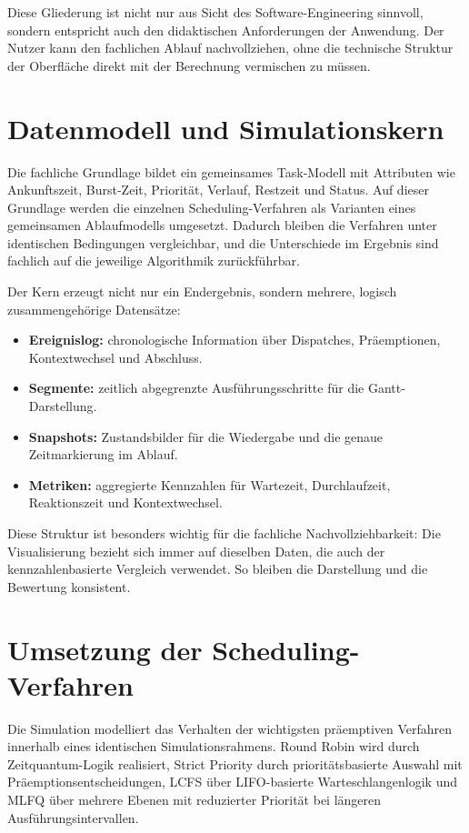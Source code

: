 Diese Gliederung ist nicht nur aus Sicht des Software-Engineering sinnvoll, sondern entspricht auch den didaktischen Anforderungen der Anwendung. Der Nutzer kann den fachlichen Ablauf nachvollziehen, ohne die technische Struktur der Oberfläche direkt mit der Berechnung vermischen zu müssen.

\section{Datenmodell und Simulationskern}

Die fachliche Grundlage bildet ein gemeinsames Task-Modell mit Attributen wie Ankunftszeit, Burst-Zeit, Priorität, Verlauf, Restzeit und Status. Auf dieser Grundlage werden die einzelnen Scheduling-Verfahren als Varianten eines gemeinsamen Ablaufmodells umgesetzt. Dadurch bleiben die Verfahren unter identischen Bedingungen vergleichbar, und die Unterschiede im Ergebnis sind fachlich auf die jeweilige Algorithmik zurückführbar.

Der Kern erzeugt nicht nur ein Endergebnis, sondern mehrere, logisch zusammengehörige Datensätze:

\begin{itemize}
    \item \textbf{Ereignislog:} chronologische Information über Dispatches, Präemptionen, Kontextwechsel und Abschluss.
    \item \textbf{Segmente:} zeitlich abgegrenzte Ausführungsschritte für die Gantt-Darstellung.
    \item \textbf{Snapshots:} Zustandsbilder für die Wiedergabe und die genaue Zeitmarkierung im Ablauf.
    \item \textbf{Metriken:} aggregierte Kennzahlen für Wartezeit, Durchlaufzeit, Reaktionszeit und Kontextwechsel.
\end{itemize}

Diese Struktur ist besonders wichtig für die fachliche Nachvollziehbarkeit: Die Visualisierung bezieht sich immer auf dieselben Daten, die auch der kennzahlenbasierte Vergleich verwendet. So bleiben die Darstellung und die Bewertung konsistent.

\section{Umsetzung der Scheduling-Verfahren}

Die Simulation modelliert das Verhalten der wichtigsten präemptiven Verfahren innerhalb eines identischen Simulationsrahmens. Round Robin wird durch Zeitquantum-Logik realisiert, Strict Priority durch prioritätsbasierte Auswahl mit Präemptionsentscheidungen, LCFS über LIFO-basierte Warteschlangenlogik und MLFQ über mehrere Ebenen mit reduzierter Priorität bei längeren Ausführungsintervallen.

